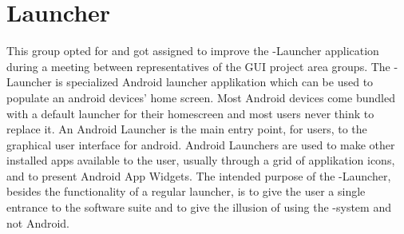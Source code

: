 
\section{Launcher}

This group opted for and got assigned to improve the \giraf-Launcher application during a meeting between representatives of the GUI project area groups.
The \giraf-Launcher is specialized Android launcher applikation which can be used to populate an android devices' home screen. Most Android devices come bundled with a default launcher for their homescreen and most users never think to replace it. An Android Launcher is the main entry point, for users, to the graphical user interface for android. Android Launchers are used to make other installed apps available to the user, usually through a grid of applikation icons, and to present Android App Widgets. The intended purpose of the \giraf-Launcher, besides the functionality of a regular launcher, is to give the user a single entrance to the \giraf software suite and to give the illusion of using the \giraf-system and not Android. 
